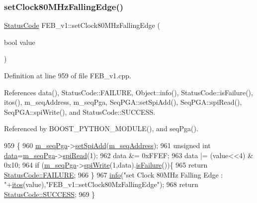 \subsubsection{\texorpdfstring{set\+Clock80\+M\+Hz\+Falling\+Edge()}{setClock80MHzFallingEdge()}}
{\footnotesize\ttfamily \hyperlink{classStatusCode}{Status\+Code} F\+E\+B\+\_\+v1\+::set\+Clock80\+M\+Hz\+Falling\+Edge (\begin{DoxyParamCaption}\item[{bool}]{value }\end{DoxyParamCaption})}



Definition at line 959 of file F\+E\+B\+\_\+v1.\+cpp.



References data(), Status\+Code\+::\+F\+A\+I\+L\+U\+RE, Object\+::info(), Status\+Code\+::is\+Failure(), itos(), m\+\_\+seq\+Address, m\+\_\+seq\+Pga, Seq\+P\+G\+A\+::set\+Spi\+Add(), Seq\+P\+G\+A\+::spi\+Read(), Seq\+P\+G\+A\+::spi\+Write(), and Status\+Code\+::\+S\+U\+C\+C\+E\+SS.



Referenced by B\+O\+O\+S\+T\+\_\+\+P\+Y\+T\+H\+O\+N\+\_\+\+M\+O\+D\+U\+L\+E(), and seq\+Pga().


\begin{DoxyCode}
959                                                      \{
960   \hyperlink{classFEB__v1_a6c7804ac86796f233a8393043adf2e77}{m\_seqPga}->\hyperlink{classSeqPGA_ac998ce3a6d9b5f2e88cc8393f8c1df53}{setSpiAdd}(\hyperlink{classFEB__v1_a1c1eb093fd1733b9510fcf8bc5c7ad08}{m\_seqAddress});
961   \textcolor{keywordtype}{unsigned} \textcolor{keywordtype}{int} \hyperlink{classFEB__v1_a6bca4320bd3bbbc32efc81097f33421a}{data}=\hyperlink{classFEB__v1_a6c7804ac86796f233a8393043adf2e77}{m\_seqPga}->\hyperlink{classSeqPGA_ab3d0e5e5d4014bc7a92588a76b8713d4}{spiRead}(1);
962   data &= 0xFFEF;
963   data |= (value<<4) & 0x10;
964   \textcolor{keywordflow}{if} (\hyperlink{classFEB__v1_a6c7804ac86796f233a8393043adf2e77}{m\_seqPga}->\hyperlink{classSeqPGA_ad4421841ce4ce8b88ad13f63216f0743}{spiWrite}(1,data).\hyperlink{classStatusCode_a5dd22dc6eb2c52fc4cabc58f6dea2eb7}{isFailure}())\{
965     \textcolor{keywordflow}{return} \hyperlink{classStatusCode_a6f565cbeadc76d14c72f047e5e85eb4ba3da73d4c469762eb9d3c960368252b26}{StatusCode::FAILURE};
966   \}
967   \hyperlink{classObject_a644fd329ea4cb85f54fa6846484b84a8}{info}(\textcolor{stringliteral}{"set Clock 80MHz Falling Edge : "}+\hyperlink{Tools_8h_af330027dbdafb9a30768b3613c553e60}{itos}(value),\textcolor{stringliteral}{"FEB\_v1::setClock80MzFallingEdge"});
968   \textcolor{keywordflow}{return} \hyperlink{classStatusCode_a6f565cbeadc76d14c72f047e5e85eb4badd0da38d3ba0d922efd1f4619bc37ad8}{StatusCode::SUCCESS};
969 \}
\end{DoxyCode}
\mbox{\label{classFEB__v1_af2bb7bacef6c06d15e2c9e47c373de08}} 
